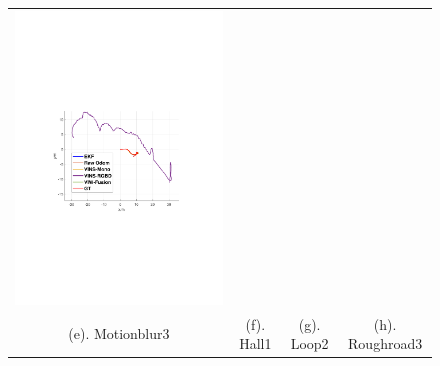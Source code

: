 \documentclass[conference]{IEEEtran}
\begin{document}
\begin{figure}
\begin{center}
\begin{tabular}{cccc}
				\includegraphics[scale=0.26]{fig/roughroad3.pdf}
				
				\\
				(e). Motionblur3 & (f).  Hall1 & (g).  Loop2 & (h).  Roughroad3\\	
				

\end{tabular}
\end{center}
\end{figure}
\end{document}
